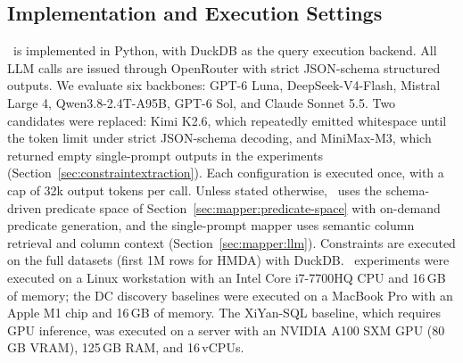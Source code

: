 \subsection{Implementation and Execution Settings}
\label{sec:implementation}

\system\ is implemented in Python, with DuckDB as the query execution backend.
All LLM calls are issued through OpenRouter with strict JSON-schema structured
outputs. We evaluate six backbones: GPT-6 Luna, DeepSeek-V4-Flash, Mistral Large 4,
Qwen3.8-2.4T-A95B, GPT-6 Sol, and Claude Sonnet 5.5. Two candidates were replaced: Kimi K2.6,
which repeatedly emitted whitespace until the token limit under strict
JSON-schema decoding, and MiniMax-M3, which returned empty single-prompt outputs
in the experiments (Section~\ref{sec:constraintextraction}). Each configuration is executed once, with a cap of 32k
output tokens per call. Unless stated otherwise, \system\ uses the schema-driven
predicate space of Section~\ref{sec:mapper:predicate-space} with on-demand predicate
generation, and the single-prompt mapper uses semantic column retrieval and
column context (Section~\ref{sec:mapper:llm}). Constraints are executed on the
full datasets (first 1M rows for HMDA) with DuckDB. \system\ experiments were
executed on a Linux workstation with an Intel Core i7-7700HQ CPU and 16\,GB of
memory; the DC discovery baselines were executed on a MacBook
Pro with an Apple M1 chip and 16\,GB of memory. The XiYan-SQL
baseline, which requires GPU inference, was executed on a server with an
NVIDIA A100 SXM GPU (80\,GB VRAM), 125\,GB RAM, and 16\,vCPUs.






